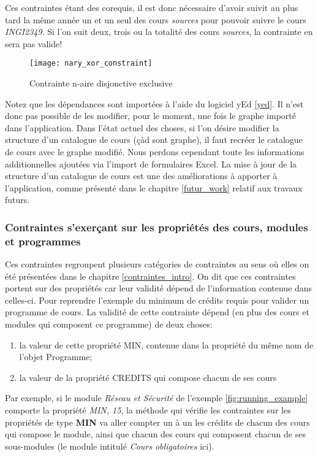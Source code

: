 Ces contraintes étant des corequis, il est donc nécessaire d'avoir suivit au plus tard la même année un et un seul des cours \textit{sources} pour pouvoir suivre le cours \textit{INGI2349}. Si l'on suit deux, trois ou la totalité des cours \textit{sources}, la contrainte en sera pas valide!

\begin{figure}
\centering
\caption{Contrainte n-aire disjonctive exclusive}
\label{fig:nary_xor_constraint}
\texttt{[image: nary\_xor\_constraint]}
\end{figure}

Notez que les dépendances sont importées à l'aide du logiciel yEd \ref{yed}. Il n'est donc pas possible de les modifier, pour le moment, une fois le graphe importé dans l'application. Dans l'état actuel des choses, si l'on désire modifier la structure d'un catalogue de cours (çàd sont graphe), il faut recréer le catalogue de cours avec le graphe modifié. Nous perdons cependant toute les informations additionnelles ajoutées via l'import de formulaires Excel. La mise à jour de la structure d'un catalogue de cours est une des améliorations à apporter à l'application, comme présenté dans le chapitre \ref{futur_work} relatif aux travaux futurs.
\subsubsection{Contraintes s’exerçant sur les propriétés des cours, modules et programmes}
\label{properties}
Ces contraintes regroupent plusieurs catégories de contraintes au sens où elles on été présentées dans le chapitre \ref{contraintes_intro}. On dit que ces contraintes portent sur des propriétés car leur validité dépend de l'information contenue dans celles-ci. Pour reprendre l'exemple du minimum de crédits requis pour valider un programme de cours. La validité de cette contrainte dépend (en plus des cours et modules qui composent ce programme) de deux choses:
\begin{enumerate}
  \item la valeur de cette propriété MIN, contenue dans la propriété du même nom de l'objet Programme;
  \item la valeur de la propriété CREDITS qui compose chacun de ses cours
\end{enumerate}

Par exemple, si le module \textit{Réseau et Sécurité} de l'exemple \ref{fig:running_example} comporte la propriété \textit{MIN, 15}, la méthode qui vérifie les contraintes sur les propriétés de type \textbf{MIN} va aller compter un à un les crédits de chacun des cours qui compose le module, ainsi que chacun des cours qui composent chacun de ses sous-modules (le module intitulé \textit{Cours obligatoires} ici).

